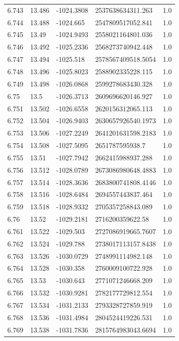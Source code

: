 \begin{tabular}{lllll}
6.743 & 13.486 & -1024.3808 & 2537638634311.263 & 1.0 \\
6.744 & 13.488 & -1024.665 & 2547809517052.841 & 1.0 \\
6.745 & 13.49 & -1024.9493 & 2558021164801.036 & 1.0 \\
6.746 & 13.492 & -1025.2336 & 2568273740942.448 & 1.0 \\
6.747 & 13.494 & -1025.518 & 2578567409518.5054 & 1.0 \\
6.748 & 13.496 & -1025.8023 & 2588902335228.115 & 1.0 \\
6.749 & 13.498 & -1026.0868 & 2599278683430.328 & 1.0 \\
6.75 & 13.5 & -1026.3713 & 2609696620146.927 & 1.0 \\
6.751 & 13.502 & -1026.6558 & 2620156312065.113 & 1.0 \\
6.752 & 13.504 & -1026.9403 & 2630657926540.1973 & 1.0 \\
6.753 & 13.506 & -1027.2249 & 2641201631598.2183 & 1.0 \\
6.754 & 13.508 & -1027.5095 & 2651787595938.7 & 1.0 \\
6.755 & 13.51 & -1027.7942 & 2662415988937.288 & 1.0 \\
6.756 & 13.512 & -1028.0789 & 2673086980648.4883 & 1.0 \\
6.757 & 13.514 & -1028.3636 & 2683800741808.4146 & 1.0 \\
6.758 & 13.516 & -1028.6484 & 2694557443837.464 & 1.0 \\
6.759 & 13.518 & -1028.9332 & 2705357258843.089 & 1.0 \\
6.76 & 13.52 & -1029.2181 & 2716200359622.58 & 1.0 \\
6.761 & 13.522 & -1029.503 & 2727086919665.7607 & 1.0 \\
6.762 & 13.524 & -1029.788 & 2738017113157.8438 & 1.0 \\
6.763 & 13.526 & -1030.0729 & 2748991114982.148 & 1.0 \\
6.764 & 13.528 & -1030.358 & 2760009100722.928 & 1.0 \\
6.765 & 13.53 & -1030.643 & 2771071246668.209 & 1.0 \\
6.766 & 13.532 & -1030.9281 & 2782177729812.554 & 1.0 \\
6.767 & 13.534 & -1031.2133 & 2793328727859.919 & 1.0 \\
6.768 & 13.536 & -1031.4984 & 2804524419226.531 & 1.0 \\
6.769 & 13.538 & -1031.7836 & 2815764983043.6694 & 1.0 \\

\end{tabular}
